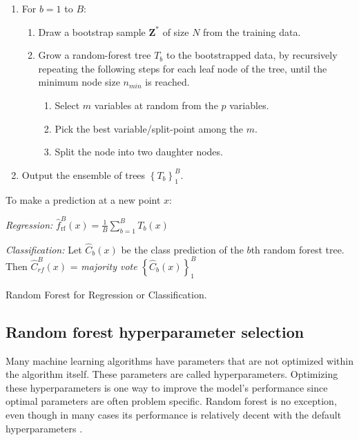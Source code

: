 \begin{algorithm}
    \footnotesize
    \begin{minipage}{.92\linewidth}
    \begin{enumerate}
        \item For $b = 1$ to $B$:
        \begin{enumerate}
            \item Draw a bootstrap sample $\bm{Z}^{*}$ of size $N$ from the training data.
            \item Grow a random-forest tree $T_b$ to the bootstrapped data, by recursively repeating the following steps for each leaf node of the tree, until the minimum node size $n_{min}$ is reached.
            \begin{enumerate}
                \item Select $m$ variables at random from the $p$ variables.
                \item Pick the best variable/split-point among the $m$.
                \item Split the node into two daughter nodes.
            \end{enumerate}
        \end{enumerate}
        \item Output the ensemble of trees $\left\{ T _ { b } \right\} _ { 1 } ^ { B }$.
    \end{enumerate}
    To make a prediction at a new point $x$:

    \textit{Regression:} $\hat { f } _ { \mathrm { rf } } ^ { B } ( x ) = \frac { 1 } { B } \sum _ { b = 1 } ^ { B } T _ { b } ( x )$

    \textit{Classification:} Let $\hat { C } _ { b } ( x )$ be the class prediction of the $b$th random forest
    tree. Then $\hat{C} _ { r f } ^ { B } ( x )$ = \textit{majority vote} $\left\{ \hat { C } _ { b } ( x ) \right\} _ { 1 } ^ { B }$
    \end{minipage}
    \caption{\footnotesize Random Forest for Regression or Classification.}
    \label{alg:random_forest}
\end{algorithm}

\subsection{Random forest hyperparameter selection}
Many machine learning algorithms have parameters that are not optimized within the algorithm itself. These parameters are called hyperparameters. Optimizing these hyperparameters is one way to improve the model's performance since optimal parameters are often problem specific. Random forest is no exception, even though in many cases its performance is relatively decent with the default hyperparameters \cite{probst2018hyperparameters}.

